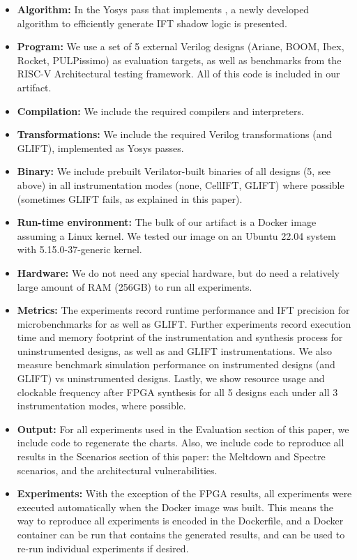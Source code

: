 \documentclass[letterpaper,twocolumn,10pt]{article}
\begin{document}
{\small
\begin{itemize}
  \item {\bf Algorithm: } In the Yosys pass that implements \ourname, a newly developed algorithm to efficiently generate IFT shadow logic is presented.
  \item {\bf Program: } We use a set of 5 external Verilog designs (Ariane, BOOM, Ibex, Rocket, PULPissimo) as evaluation targets, as well as benchmarks
      from the RISC-V Architectural testing framework. All of this code is included in our artifact.
  \item {\bf Compilation: } We include the required compilers and interpreters.
  \item {\bf Transformations: } We include the required Verilog transformations (\ourname and GLIFT), implemented as Yosys passes.
  \item {\bf Binary: } We include prebuilt Verilator-built binaries of all designs (5, see above) in all instrumentation modes (none, CellIFT, GLIFT) where possible (sometimes GLIFT fails, as explained in this paper).
  \item {\bf Run-time environment: } The bulk of our artifact is a Docker image assuming a Linux kernel. We tested our image on an Ubuntu 22.04 system with 5.15.0-37-generic kernel.
  \item {\bf Hardware: } We do not need any special hardware, but do need a relatively large amount of RAM (256GB) to run all experiments.
  \item {\bf Metrics: } The experiments record runtime performance and IFT precision for microbenchmarks for \ourname as well as GLIFT. Further experiments record execution time and memory footprint of the instrumentation and synthesis process for uninstrumented designs, as well as \ourname and GLIFT instrumentations. We also measure benchmark simulation performance on instrumented designs (\ourname and GLIFT) vs uninstrumented designs. Lastly, we show resource usage and clockable frequency after FPGA synthesis for all 5 designs each under all 3 instrumentation modes, where possible.
  \item {\bf Output: } For all experiments used in the Evaluation section of this paper, we include code to regenerate the charts. Also, we include code to reproduce all results in the Scenarios section of this paper: the Meltdown and Spectre scenarios, and the architectural vulnerabilities. 
  \item {\bf Experiments: } With the exception of the FPGA results, all experiments were executed automatically when the Docker image was built. This means the way to reproduce all experiments is encoded in the Dockerfile, and a Docker container can be run that contains the generated results, and can be used to re-run individual experiments if desired. 

\end{itemize}}
\end{document}
